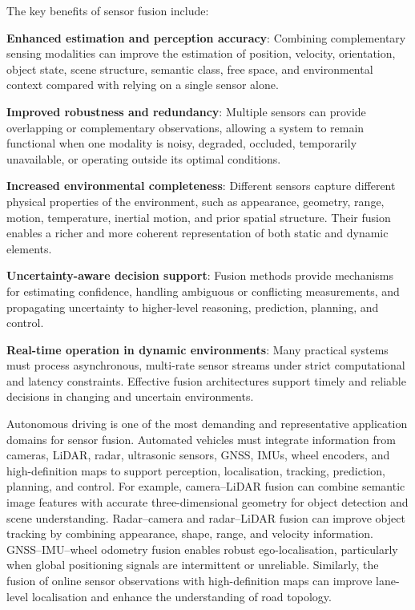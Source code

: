 The key benefits of sensor fusion include:
\begin{list4a}
    \item \textbf{Enhanced estimation and perception accuracy}: Combining complementary sensing modalities can improve the estimation of position, velocity, orientation, object state, scene structure, semantic class, free space, and environmental context compared with relying on a single sensor alone.
    \item \textbf{Improved robustness and redundancy}: Multiple sensors can provide overlapping or complementary observations, allowing a system to remain functional when one modality is noisy, degraded, occluded, temporarily unavailable, or operating outside its optimal conditions.
    \item \textbf{Increased environmental completeness}: Different sensors capture different physical properties of the environment, such as appearance, geometry, range, motion, temperature, inertial motion, and prior spatial structure. Their fusion enables a richer and more coherent representation of both static and dynamic elements.
    \item \textbf{Uncertainty-aware decision support}: Fusion methods provide mechanisms for estimating confidence, handling ambiguous or conflicting measurements, and propagating uncertainty to higher-level reasoning, prediction, planning, and control.
    \item \textbf{Real-time operation in dynamic environments}: Many practical systems must process asynchronous, multi-rate sensor streams under strict computational and latency constraints. Effective fusion architectures support timely and reliable decisions in changing and uncertain environments.
\end{list4a}

Autonomous driving is one of the most demanding and representative application domains for sensor fusion. Automated vehicles must integrate information from cameras, LiDAR, radar, ultrasonic sensors, GNSS, IMUs, wheel encoders, and high-definition maps to support perception, localisation, tracking, prediction, planning, and control. For example, camera--LiDAR fusion can combine semantic image features with accurate three-dimensional geometry for object detection and scene understanding. Radar--camera and radar--LiDAR fusion can improve object tracking by combining appearance, shape, range, and velocity information. GNSS--IMU--wheel odometry fusion enables robust ego-localisation, particularly when global positioning signals are intermittent or unreliable. Similarly, the fusion of online sensor observations with high-definition maps can improve lane-level localisation and enhance the understanding of road topology.

